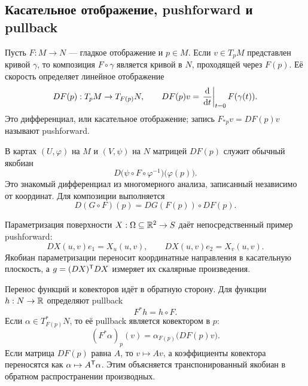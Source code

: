 \subsection{Касательное отображение, pushforward и pullback}

Пусть \(F:M\to N\) --- гладкое отображение и \(p\in M\). Если \(v\in T_pM\) представлен кривой \(\gamma\), то композиция \(F\circ\gamma\) является кривой в \(N\), проходящей через \(F(p)\). Её скорость определяет линейное отображение
\begin{equation}
\label{eq:tangent-map-definition}
DF(p):T_pM\to T_{F(p)}N,
\qquad
DF(p)v
=
\left.\frac{\mathop{}\!\mathrm{d} }{\mathop{}\!\mathrm{d} t}\right|_{t=0}F(\gamma(t)).
\end{equation}
Это дифференциал, или касательное отображение; запись \(F_{*p}v=DF(p)v\) называют pushforward.

В картах \((U,\varphi)\) на \(M\) и \((V,\psi)\) на \(N\) матрицей \(DF(p)\) служит обычный якобиан
\begin{equation}
\label{eq:tangent-map-coordinate-jacobian}
D\bigl(\psi\circ F\circ\varphi^{-1}\bigr)\bigl(\varphi(p)\bigr).
\end{equation}
Это знакомый дифференциал из многомерного анализа, записанный независимо от координат. Для композиции выполняется
\begin{equation}
\label{eq:tangent-map-chain-rule}
D(G\circ F)(p)
=
DG(F(p))\circ DF(p).
\end{equation}

Параметризация поверхности \(X:\Omega\subseteq\mathbb{R}^2\to S\) даёт непосредственный пример pushforward:
\begin{equation}
\label{eq:parametrization-pushforward-basis}
DX(u,v)e_1=X_u(u,v),
\qquad
DX(u,v)e_2=X_v(u,v).
\end{equation}
Якобиан параметризации переносит координатные направления в касательную плоскость, а \(g=(DX)^{\mathsf{T}}DX\) измеряет их скалярные произведения.

Перенос функций и ковекторов идёт в обратную сторону. Для функции \(h:N\to\mathbb{R}\) определяют pullback
\begin{equation}
\label{eq:function-pullback}
F^*h=h\circ F.
\end{equation}
Если \(\alpha\in T_{F(p)}^*N\), то её pullback является ковектором в \(p\):
\begin{equation}
\label{eq:covector-pullback}
(F^*\alpha)_p(v)
=
\alpha_{F(p)}\bigl(DF(p)v\bigr).
\end{equation}
Если матрица \(DF(p)\) равна \(A\), то \(v\mapsto Av\), а коэффициенты ковектора переносятся как \(\alpha\mapsto A^{\mathsf{T}}\alpha\). Этим объясняется транспонированный якобиан в обратном распространении производных.

